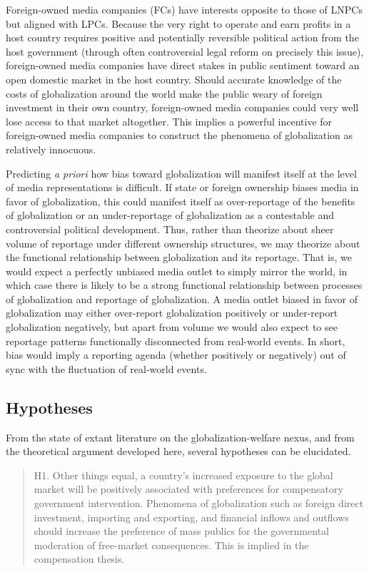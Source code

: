 \documentclass[12pt]{report}
\begin{document}
Foreign-owned media companies (FCs) have interests opposite to those of LNPCs but aligned with LPCs. Because the very right to operate and earn profits in a host country requires positive and potentially reversible political action from the host government (through often controversial legal reform on precisely this issue), foreign-owned media companies have direct stakes in public sentiment toward an open domestic market in the host country. Should accurate knowledge of the costs of globalization around the world make the public weary of foreign investment in their own country, foreign-owned media companies could very well lose access to that market altogether. This implies a powerful incentive for foreign-owned media companies to construct the phenomena of globalization as relatively innocuous. 

Predicting \emph{a priori} how bias toward globalization will manifest itself at the level of media representations is difficult. If state or foreign ownership biases media in favor of globalization, this could manifest itself as over-reportage of the benefits of globalization or an under-reportage of globalization as a contestable and controversial political development. Thus, rather than theorize about sheer volume of reportage under different ownership structures, we may theorize about the functional relationship between globalization and its reportage. That is, we would expect a perfectly unbiased media outlet to simply mirror the world, in which case there is likely to be a strong functional relationship between processes of globalization and reportage of globalization. A media outlet biased in favor of globalization may either over-report globalization positively or under-report globalization negatively, but apart from volume we would also expect to see reportage patterns functionally disconnected from real-world events. In short, bias would imply a reporting agenda (whether positively or negatively) out of sync with the fluctuation of real-world events.

\subsection{Hypotheses}
From the state of extant literature on the globalization-welfare nexus, and from the theoretical argument developed here, several hypotheses can be elucidated.

\singlespacing
\begin{quote}
H1. Other things equal, a country's increased exposure to the global market will be positively associated with preferences for compensatory government intervention. Phenomena of globalization such as foreign direct investment, importing and exporting, and financial inflows and outflows should increase the preference of mass publics for the governmental moderation of free-market consequences. This is implied in the compensation thesis.
\end{quote}
\doublespacing
\end{document}
